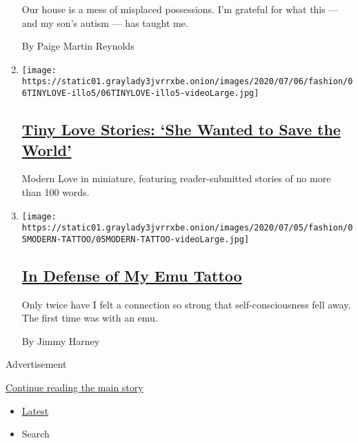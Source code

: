 \begin{enumerate}
  Our house is a mess of misplaced possessions. I'm grateful for what
  this --- and my son's autism --- has taught me.

  By Paige Martin Reynolds
\item
  \texttt{[image: https://static01.graylady3jvrrxbe.onion/images/2020/07/06/fashion/06TINYLOVE-illo5/06TINYLOVE-illo5-videoLarge.jpg]}

  \hypertarget{tiny-love-stories-she-wanted-to-save-the-world}{%
  \subsection{\texorpdfstring{\href{/2020/07/07/style/tiny-modern-love-stories-coronavirus-she-wanted-to-save-the-world.html}{Tiny
  Love Stories: `She Wanted to Save the
  World'}}{Tiny Love Stories: `She Wanted to Save the World'}}\label{tiny-love-stories-she-wanted-to-save-the-world}}

  Modern Love in miniature, featuring reader-submitted stories of no
  more than 100 words.
\item
  \texttt{[image: https://static01.graylady3jvrrxbe.onion/images/2020/07/05/fashion/05MODERN-TATTOO/05MODERN-TATTOO-videoLarge.jpg]}

  \hypertarget{in-defense-of-my-emu-tattoo}{%
  \subsection{\texorpdfstring{\href{/2020/07/03/style/modern-love-in-defense-of-my-emu-tattoo.html}{In
  Defense of My Emu
  Tattoo}}{In Defense of My Emu Tattoo}}\label{in-defense-of-my-emu-tattoo}}

  Only twice have I felt a connection so strong that self-consciousness
  fell away. The first time was with an emu.

  By Jimmy Harney
\end{enumerate}

Advertisement

\protect\hyperlink{after-mid1}{Continue reading the main story}

\begin{itemize}
\tightlist
\item
  \protect\hyperlink{stream-panel}{Latest}
\item
  Search
\end{itemize}

